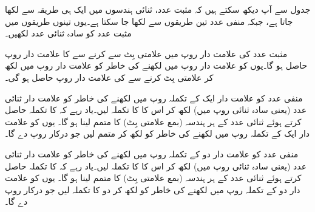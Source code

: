 جدول  سے آپ دیکھ سکتے ہیں کہ مثبت عدد،   ثنائی ہندسوں میں ایک ہی طریقہ سے لکھا جاتا ہے،  جبکہ منفی عدد  تین طریقوں سے لکھا   جا سکتا ہے۔یوں  تینوں  طریقوں میں مثبت عدد کو سادہ  ثنائی عدد لکھیں۔

	مثبت عدد    کی  علامت دار روپ  میں  علامتی  بِٹ       سے     کرنے سے     کا علامت دار  روپ    حاصل ہو گا۔یوں  کو  علامت دار روپ   میں لکھنے کی خاطر   کو علامت دار روپ    میں لکھ کر علامتی بِٹ   کرنے سے  کی علامت دار روپ    حاصل ہو گی۔
	
منفی عدد   کو  علامت دار ایک کے   تکملہ  روپ میں لکھنے کی خاطر   کو علامت دار  ثنائی عدد (یعنی سادہ ثنائی  روپ میں)   لکھ کر اس کا    کا تکملہ  لیں۔یاد رہے کہ   کا تکملہ  حاصل کرتے ہوئے  ثنائی عدد کے ہر ہندسہ  (بمع  علامتی بِٹ) کا متمم لینا ہو گا۔ یوں  کو علامت دار ایک کے  تکملہ   روپ  میں لکھنے کی خاطر    کو     لکھ  کر متمم لیں   جو درکار روپ     دے گا۔

منفی عدد   کو  علامت دار   دو کے تکملہ   روپ میں لکھنے کی خاطر   کو علامت دار  ثنائی عدد (یعنی سادہ ثنائی  روپ میں)   لکھ کر اس کا   کا   تکملہ  لیں۔یاد رہے کہ   کا تکملہ  حاصل کرتے ہوئے  ثنائی عدد کے ہر ہندسہ  (بمع  علامتی بِٹ) کا متمم لینا ہو گا۔ یوں  کو علامت دار  دو کے تکملہ   روپ  میں لکھنے کی خاطر    کو     لکھ  کر دو کا   تکملہ  لیں   جو درکار روپ      دے گا۔
